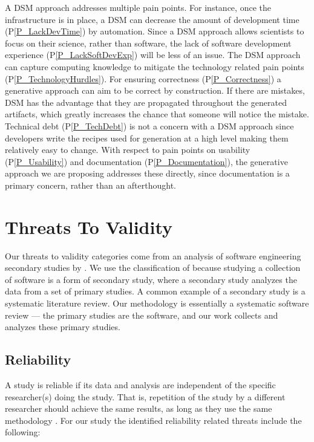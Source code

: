 \documentclass[final, 3p, times, authoryear]{elsarticle}
\newcommand{\ppref}[1]{P\ref{#1}}
\begin{document}
A DSM approach addresses multiple pain points.  For instance, once the
infrastructure is in place, a DSM can decrease the amount of development time
(\ppref{P_LackDevTime}) by automation.  Since a DSM approach allows scientists
to focus on their science, rather than software, the lack of software
development experience (\ppref{P_LackSoftDevExp}) will be less of an issue. The
DSM approach can capture computing knowledge to mitigate the technology related
pain points (\ppref{P_TechnologyHurdles}).  For ensuring correctness
(\ppref{P_Correctness}) a generative approach can aim to be correct by
construction.  If there are mistakes, DSM has the advantage that they are
propagated throughout the generated artifacts, which greatly increases the
chance that someone will notice the mistake.  Technical debt
(\ppref{P_TechDebt}) is not a concern with a DSM approach since developers write
the recipes used for generation at a high level making them relatively easy to
change.  With respect to pain points on usability (\ppref{P_Usability}) and
documentation (\ppref{P_Documentation}), the generative approach we are
proposing addresses these directly, since documentation is a primary concern,
rather than an afterthought.

\section{Threats To Validity} \label{threats}

Our threats to validity categories come from an analysis of software engineering
secondary studies by \citet{AmpatzoglouEtAl2019}.  We use the classification of
\citet{AmpatzoglouEtAl2019} because studying a collection of software is a form
of secondary study, where a secondary study analyzes the data from a set of
primary studies.  A common example of a secondary study is a systematic
literature review.  Our methodology is essentially a systematic software review
--- the primary studies are the software, and our work collects and analyzes
these primary studies.

\subsection{Reliability}

A study is reliable if its data and analysis are independent of the specific
researcher(s) doing the study.  That is, repetition of the study by a different
researcher should achieve the same results, as long as they use the same
methodology \citep{AmpatzoglouEtAl2019}.  For our study the identified
reliability related threats include the following:
\end{document}
